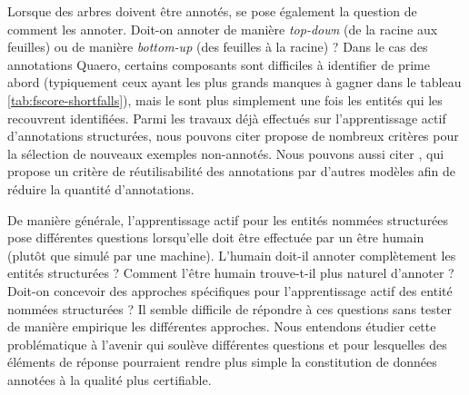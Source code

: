 \documentclass[PhD-Yoann-Dupont.tex]{subfiles}
\begin{document}
Lorsque des arbres doivent être annotés, se pose également la question de comment les annoter. Doit-on annoter de manière \emph{top-down} (de la racine aux feuilles) ou de manière \emph{bottom-up} (des feuilles à la racine) ? Dans le cas des annotations Quaero, certains composants sont difficiles à identifier de prime abord (typiquement ceux ayant les plus grands manques à gagner dans le tableau \ref{tab:fscore-shortfalls}), mais le sont plus simplement une fois les entités qui les recouvrent identifiées. Parmi les travaux déjà effectués sur l'apprentissage actif d'annotations structurées, nous pouvons citer \citet{hwa2004sample} propose de nombreux critères pour la sélection de nouveaux exemples non-annotés. Nous pouvons aussi citer \citet{baldridge2004active}, qui propose un critère de réutilisabilité des annotations par d'autres modèles afin de réduire la quantité d'annotations.

De manière générale, l'apprentissage actif pour les entités nommées structurées pose différentes questions lorsqu'elle doit être effectuée par un être humain (plutôt que simulé par une machine). L'humain doit-il annoter complètement les entités structurées ? Comment l'être humain trouve-t-il plus naturel d'annoter ? Doit-on concevoir des approches spécifiques pour l'apprentissage actif des entité nommées structurées ? Il semble difficile de répondre à ces questions sans tester de manière empirique les différentes approches. Nous entendons étudier cette problématique à l'avenir qui soulève différentes questions et pour lesquelles des éléments de réponse pourraient rendre plus simple la constitution de données annotées à la qualité plus certifiable.
\end{document}
